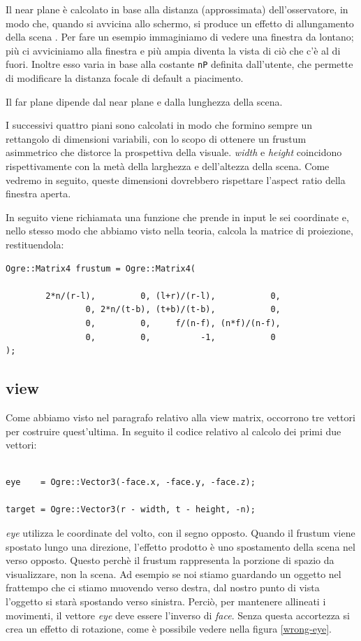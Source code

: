 Il near plane è calcolato in base alla distanza (approssimata) dell'osservatore, in modo che, quando si avvicina allo schermo, si produce un effetto di allungamento della scena . Per fare un esempio immaginiamo di vedere una finestra da lontano; più ci avviciniamo alla finestra e più ampia diventa la vista di ciò che c'è al di fuori. Inoltre esso varia in base alla costante \texttt{nP} definita dall'utente, che permette di modificare la distanza focale di default a piacimento.

Il far plane dipende dal near plane e dalla lunghezza della scena.

I successivi quattro piani sono calcolati in modo che formino sempre un rettangolo di dimensioni variabili, con lo scopo di ottenere un frustum asimmetrico che distorce la prospettiva della visuale.
\textit{width} e \textit{height} coincidono rispettivamente con la metà della larghezza e dell'altezza della scena. Come vedremo in seguito, queste dimensioni dovrebbero rispettare l'aspect ratio della finestra aperta.

In seguito viene richiamata una funzione che prende in input le sei coordinate e, nello stesso modo che abbiamo visto nella teoria, calcola la matrice di proiezione, restituendola:

\begin{lstlisting}
Ogre::Matrix4 frustum = Ogre::Matrix4(
        
        2*n/(r-l),         0, (l+r)/(r-l),           0,
                0, 2*n/(t-b), (t+b)/(t-b),           0,
                0,         0,     f/(n-f), (n*f)/(n-f),
                0,         0,          -1,           0
);

\end{lstlisting}

\subsection{view}
Come abbiamo visto nel paragrafo relativo alla view matrix, occorrono tre vettori per costruire quest'ultima.
In seguito il codice relativo al calcolo dei primi due vettori:
\begin{lstlisting}

eye    = Ogre::Vector3(-face.x, -face.y, -face.z);

target = Ogre::Vector3(r - width, t - height, -n);
\end{lstlisting}
\textit{eye} utilizza le coordinate del volto, con il segno opposto. Quando il frustum viene spostato lungo una direzione, l'effetto prodotto è uno spostamento della scena nel verso opposto. Questo perchè il frustum rappresenta la porzione di spazio da visualizzare, non la scena. Ad esempio se noi stiamo guardando un oggetto nel frattempo che ci stiamo muovendo verso destra, dal nostro punto di vista l'oggetto si starà spostando verso sinistra. Perciò, per mantenere allineati i movimenti, il vettore \textit{eye} deve essere l'inverso di \textit{face}.
Senza questa accortezza si crea un effetto di rotazione, come è possibile vedere nella figura \ref{wrong-eye}.

